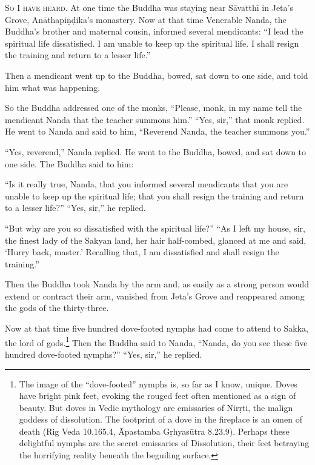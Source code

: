 \documentclass[12pt,openany]{book}%
\newcommand*{\scevam}[1]{\textsc{#1}}
\begin{document}
\scevam{So I have heard. }At one time the Buddha was staying near \textsanskrit{Sāvatthī} in Jeta’s Grove, \textsanskrit{Anāthapiṇḍika}’s monastery. Now at that time Venerable Nanda, the Buddha’s brother and maternal cousin, informed several mendicants: “I lead the spiritual life dissatisfied. I am unable to keep up the spiritual life. I shall resign the training and return to a lesser life.” 

Then a mendicant went up to the Buddha, bowed, sat down to one side, and told him what was happening. 

So the Buddha addressed one of the monks, “Please, monk, in my name tell the mendicant Nanda that the teacher summons him.” “Yes, sir,” that monk replied. He went to Nanda and said to him, “Reverend Nanda, the teacher summons you.” 

“Yes, reverend,” Nanda replied. He went to the Buddha, bowed, and sat down to one side. The Buddha said to him: 

“Is it really true, Nanda, that you informed several mendicants that you are unable to keep up the spiritual life; that you shall resign the training and return to a lesser life?” “Yes, sir,” he replied. 

“But why are you so dissatisfied with the spiritual life?” “As I left my house, sir, the finest lady of the Sakyan land, her hair half-combed, glanced at me and said, ‘Hurry back, master.’ Recalling that, I am dissatisfied and shall resign the training.” 

Then the Buddha took Nanda by the arm and, as easily as a strong person would extend or contract their arm, vanished from Jeta’s Grove and reappeared among the gods of the thirty-three. 

Now at that time five hundred dove-footed nymphs had come to attend to Sakka, the lord of gods.\footnote{The image of the “dove-footed” nymphs is, so far as I know, unique. Doves have bright pink feet, evoking the rouged feet often mentioned as a sign of beauty. But doves in Vedic mythology are emissaries of  \textsanskrit{Nirṛti}, the malign goddess of dissolution. The footprint of a dove in the fireplace is an omen of death (Rig Veda 10.165.4,  Āpastamba \textsanskrit{Gṛhyasūtra} 8.23.9). Perhaps these delightful nymphs are the secret emissaries of Dissolution, their feet betraying the horrifying reality beneath the beguiling surface. } Then the Buddha said to Nanda, “Nanda, do you see these five hundred dove-footed nymphs?” “Yes, sir,” he replied. 
\end{document}
